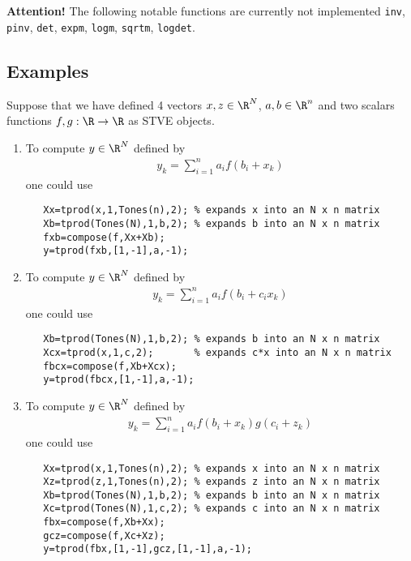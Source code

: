 \documentclass[11pt]{article}
\theoremstyle{remark}
\begin{document}
\noindent
\textbf{Attention!}
The following notable functions are currently not implemented
\lstinline{inv},
\lstinline{pinv},
\lstinline{det},
\lstinline{expm},
\lstinline{logm},
\lstinline{sqrtm},
\lstinline{logdet}.

\subsection{Examples}

\begin{example}
  Suppose that we have defined 4 vectors $x,z\in\R^N$, $a,b\in\R^n$ and two
  scalars functions $f,g:\R\to\R$ as STVE objects.
  \begin{enumerate}
  \item To compute $y\in\R^N$ defined by
    \begin{align*}
      y_k=\sum_{i=1}^n a_i f(b_i+x_k)
    \end{align*}
    one could use
\begin{lstlisting}
   Xx=tprod(x,1,Tones(n),2); % expands x into an N x n matrix
   Xb=tprod(Tones(N),1,b,2); % expands b into an N x n matrix
   fxb=compose(f,Xx+Xb);
   y=tprod(fxb,[1,-1],a,-1);
\end{lstlisting}
  \item To compute $y\in\R^N$ defined by
    \begin{align*}
      y_k=\sum_{i=1}^n a_i f(b_i+c_i x_k)
    \end{align*}
    one could use
\begin{lstlisting}
   Xb=tprod(Tones(N),1,b,2); % expands b into an N x n matrix
   Xcx=tprod(x,1,c,2);       % expands c*x into an N x n matrix
   fbcx=compose(f,Xb+Xcx);
   y=tprod(fbcx,[1,-1],a,-1);
\end{lstlisting}
  \item To compute $y\in\R^N$ defined by
    \begin{align*}
      y_k=\sum_{i=1}^n a_i f(b_i+x_k) g(c_i+z_k)
    \end{align*}
    one could use
\begin{lstlisting}
   Xx=tprod(x,1,Tones(n),2); % expands x into an N x n matrix
   Xz=tprod(z,1,Tones(n),2); % expands z into an N x n matrix
   Xb=tprod(Tones(N),1,b,2); % expands b into an N x n matrix
   Xc=tprod(Tones(N),1,c,2); % expands c into an N x n matrix
   fbx=compose(f,Xb+Xx);
   gcz=compose(f,Xc+Xz);
   y=tprod(fbx,[1,-1],gcz,[1,-1],a,-1);
\end{lstlisting}
    
  \end{enumerate}
  

\end{example}
\end{document}
